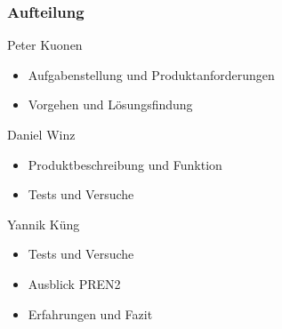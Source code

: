 \begin{frame}
    \frametitle{Aufteilung}
    \begin{block}{Peter Kuonen}
        \begin{itemize}
            \item Aufgabenstellung und Produktanforderungen
            \item Vorgehen und Lösungsfindung
        \end{itemize}
    \end{block}
    \begin{block}{Daniel Winz}
        \begin{itemize}
            \item Produktbeschreibung und Funktion
            \item Tests und Versuche
        \end{itemize}
    \end{block}
    \begin{block}{Yannik Küng}
        \begin{itemize}
            \item Tests und Versuche
            \item Ausblick PREN2
            \item Erfahrungen und Fazit
        \end{itemize}
    \end{block}
\end{frame}

